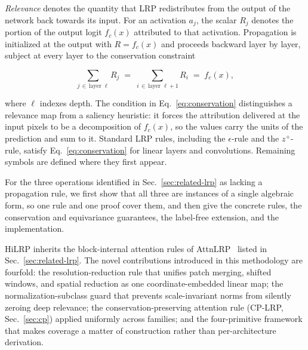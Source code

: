 \documentclass[lettersize,journal]{IEEEtran}
\theoremstyle{definition}
\theoremstyle{plain}
\begin{document}
\emph{Relevance} denotes the quantity that LRP redistributes from the output of the network back towards its input. For an activation $a_j$, the scalar $R_j$ denotes the portion of the output logit $f_c(x)$ attributed to that activation. Propagation is initialized at the output with $R=f_c(x)$ and proceeds backward layer by layer, subject at every layer to the conservation constraint

\begin{equation}
\label{eq:conservation}
\sum_{j\,\in\,\text{layer }\ell} R_j \;=\; \sum_{i\,\in\,\text{layer }\ell+1} R_i
\;=\; f_c(x),
\end{equation}

where $\ell$ indexes depth. The condition in Eq.~\eqref{eq:conservation} distinguishes a relevance map from a saliency heuristic: it forces the attribution delivered at the input pixels to be a decomposition of $f_c(x)$, so the values carry the units of the prediction and sum to it. Standard LRP rules, including the $\epsilon$-rule and the $z^{+}$-rule, satisfy Eq.~\eqref{eq:conservation} for linear layers and convolutions. Remaining symbols are defined where they first appear.

For the three operations identified in Sec.~\ref{sec:related-lrp} as lacking a propagation rule, we
first show that all three are instances of a single algebraic form, so one rule and one proof cover
them, and then give the concrete rules, the conservation and equivariance guarantees, the
label-free extension, and the implementation.

HiLRP inherits the block-internal attention rules of AttnLRP~\cite{achtibat2024attnlrp} listed in
Sec.~\ref{sec:related-lrp}. The novel contributions introduced in this methodology are fourfold: the resolution-reduction rule that unifies patch merging, shifted 
windows, and spatial reduction as one coordinate-embedded linear map; the normalization-subclass 
guard that prevents scale-invariant norms from silently zeroing deep relevance; the 
conservation-preserving attention rule (CP-LRP, Sec.~\ref{sec:cp}) applied uniformly across families; and the 
four-primitive framework that makes coverage a matter of construction rather than per-architecture 
derivation.
\end{document}
